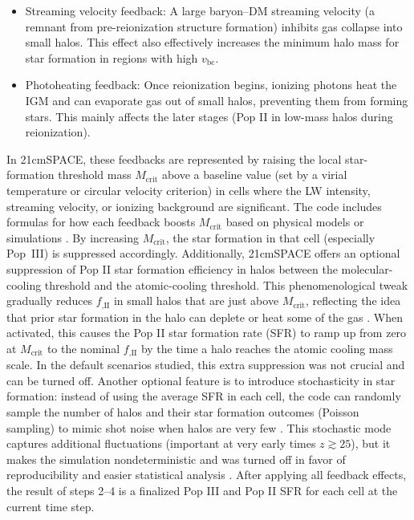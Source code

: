 \documentclass[floats,floatfix,showpacs,amssymb,prd,superscriptaddress,nofootinbib]{revtex4-2} %
\begin{document}
\begin{enumerate}
\begin{itemize}
        \item Streaming velocity feedback: A large baryon–DM streaming velocity (a remnant from pre-reionization structure formation) inhibits gas collapse into small halos. This effect also effectively increases the minimum halo mass for star formation in regions with high $v_{\text{bc}}$.

        \item Photoheating feedback: Once reionization begins, ionizing photons heat the IGM and can evaporate gas out of small halos, preventing them from forming stars. This mainly affects the later stages (Pop II in low-mass halos during reionization).
    \end{itemize}

    In 21cmSPACE, these feedbacks are represented by raising the local star-formation threshold mass $M_{\text{crit}}$ above a baseline value (set by a virial temperature or circular velocity criterion) in cells where the LW intensity, streaming velocity, or ionizing background are significant. The code includes formulas for how each feedback boosts $M_{\text{crit}}$ based on physical models or simulations \citep{gessey-jones_2024}. By increasing $M_{\text{crit}}$, the star formation in that cell (especially Pop III) is suppressed accordingly. Additionally, 21cmSPACE offers an optional suppression of Pop II star formation efficiency in halos between the molecular-cooling threshold and the atomic-cooling threshold. This phenomenological tweak gradually reduces $f_{,\text{II}}$ in small halos that are just above $M_{\text{crit}}$, reflecting the idea that prior star formation in the halo can deplete or heat some of the gas \citep{gessey-jones_2024}. When activated, this causes the Pop II star formation rate (SFR) to ramp up from zero at $M_{\text{crit}}$ to the nominal $f_{,\text{II}}$ by the time a halo reaches the atomic cooling mass scale. In the default scenarios studied, this extra suppression was not crucial and can be turned off. Another optional feature is to introduce stochasticity in star formation: instead of using the average SFR in each cell, the code can randomly sample the number of halos and their star formation outcomes (Poisson sampling) to mimic shot noise when halos are very few \citep{gessey-jones_2024}. This stochastic mode captures additional fluctuations (important at very early times $z\gtrsim25$), but it makes the simulation nondeterministic and was turned off in favor of reproducibility and easier statistical analysis \citep{gessey-jones_2024}. After applying all feedback effects, the result of steps 2–4 is a finalized Pop III and Pop II SFR for each cell at the current time step.


\end{enumerate}
\end{document}
